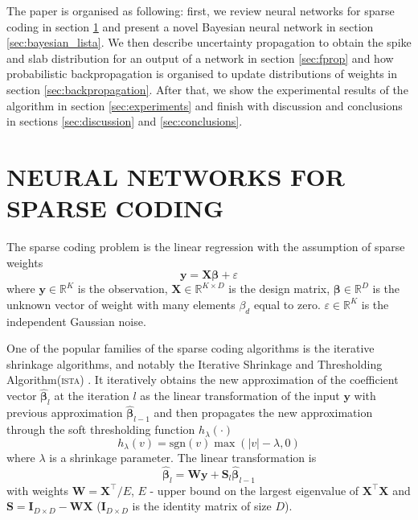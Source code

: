 \documentclass[letterpaper]{article}
\begin{document}
The paper is organised as following: first, we review neural networks for sparse coding in section \ref{sec:nn_sc} and present a novel Bayesian neural network in section \ref{sec:bayesian_lista}. We then describe uncertainty propagation to obtain the spike and slab distribution for an output of a network in section \ref{sec:fprop} and how probabilistic backpropagation is organised to update distributions of weights in section \ref{sec:backpropagation}. After that, we show the experimental results of the algorithm in section \ref{sec:experiments} and finish with discussion and conclusions in sections \ref{sec:discussion} and \ref{sec:conclusions}.

\section{\uppercase{Neural networks for sparse coding}}
\label{sec:nn_sc}
The sparse coding problem is the linear regression with the assumption of sparse weights
\begin{equation}
\label{eq:regression_problem}
\mathbf{y} = \mathbf{X}\boldsymbol\beta + \varepsilon
\end{equation}
where $\mathbf{y} \in \mathbb{R}^K$ is the observation, $\mathbf{X} \in \mathbb{R}^{K \times D}$ is the design matrix, $\boldsymbol\beta \in \mathbb{R}^D$ is the unknown vector of weight with many elements $\beta_d$ equal to zero. $\varepsilon \in \mathbb{R}^K$ is the independent Gaussian noise.

One of the popular families of the sparse coding algorithms is the iterative shrinkage algorithms, and notably the Iterative Shrinkage and Thresholding Algorithm(\textsc{ista}) \citep{daubechies2004iterative}. It iteratively obtains the new approximation of the coefficient vector $\widehat{\boldsymbol\beta}_l$ at the iteration $l$ as the linear transformation of the input $\mathbf{y}$ with previous approximation $\widehat{\boldsymbol\beta}_{l-1}$ and then propagates the new approximation through the soft thresholding function $h_\lambda(\cdot)$
\begin{equation}
h_\lambda(v) = \text{sgn}(v) \max(|v| - \lambda, 0)
\end{equation}
where $\lambda$ is a shrinkage parameter.
The linear transformation is
\begin{equation}
\widehat{\boldsymbol\beta}_l = \mathbf{W}\mathbf{y} + \mathbf{S}_l\widehat{\boldsymbol\beta}_{l-1}
\end{equation}
with weights $\mathbf{W} = \mathbf{X}^\top / E$, $E$ - upper bound on the largest eigenvalue of $\mathbf{X}^\top\mathbf{X}$ and $\mathbf{S} = \mathbf{I}_{D \times D} - \mathbf{W}\mathbf{X}$ ($\mathbf{I}_{D \times D}$ is the identity matrix of size $D$).
\end{document}
